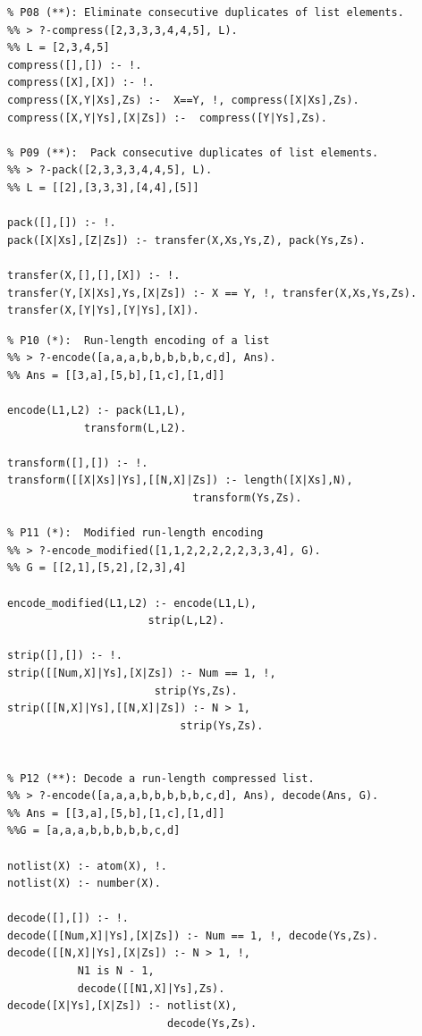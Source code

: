 \documentclass[a4paper,12pt]{book}
\begin{document}
\begin{verbatim}
% P08 (**): Eliminate consecutive duplicates of list elements.
%% > ?-compress([2,3,3,3,4,4,5], L).
%% L = [2,3,4,5]
compress([],[]) :- !.
compress([X],[X]) :- !.
compress([X,Y|Xs],Zs) :-  X==Y, !, compress([X|Xs],Zs).
compress([X,Y|Ys],[X|Zs]) :-  compress([Y|Ys],Zs).

% P09 (**):  Pack consecutive duplicates of list elements.
%% > ?-pack([2,3,3,3,4,4,5], L).
%% L = [[2],[3,3,3],[4,4],[5]]

pack([],[]) :- !.
pack([X|Xs],[Z|Zs]) :- transfer(X,Xs,Ys,Z), pack(Ys,Zs).

transfer(X,[],[],[X]) :- !.
transfer(Y,[X|Xs],Ys,[X|Zs]) :- X == Y, !, transfer(X,Xs,Ys,Zs).
transfer(X,[Y|Ys],[Y|Ys],[X]).
\end{verbatim}

\begin{verbatim}
% P10 (*):  Run-length encoding of a list
%% > ?-encode([a,a,a,b,b,b,b,b,c,d], Ans).
%% Ans = [[3,a],[5,b],[1,c],[1,d]]

encode(L1,L2) :- pack(L1,L),
            transform(L,L2).

transform([],[]) :- !.
transform([[X|Xs]|Ys],[[N,X]|Zs]) :- length([X|Xs],N),
                             transform(Ys,Zs).

% P11 (*):  Modified run-length encoding
%% > ?-encode_modified([1,1,2,2,2,2,2,3,3,4], G).
%% G = [[2,1],[5,2],[2,3],4]

encode_modified(L1,L2) :- encode(L1,L),
                      strip(L,L2).

strip([],[]) :- !.
strip([[Num,X]|Ys],[X|Zs]) :- Num == 1, !,
                       strip(Ys,Zs).
strip([[N,X]|Ys],[[N,X]|Zs]) :- N > 1,
                           strip(Ys,Zs).


% P12 (**): Decode a run-length compressed list.
%% > ?-encode([a,a,a,b,b,b,b,b,c,d], Ans), decode(Ans, G).
%% Ans = [[3,a],[5,b],[1,c],[1,d]]
%%G = [a,a,a,b,b,b,b,b,c,d]

notlist(X) :- atom(X), !.
notlist(X) :- number(X).

decode([],[]) :- !.
decode([[Num,X]|Ys],[X|Zs]) :- Num == 1, !, decode(Ys,Zs).
decode([[N,X]|Ys],[X|Zs]) :- N > 1, !,
           N1 is N - 1,
           decode([[N1,X]|Ys],Zs).
decode([X|Ys],[X|Zs]) :- notlist(X),
                         decode(Ys,Zs).
\end{verbatim}
\end{document}
